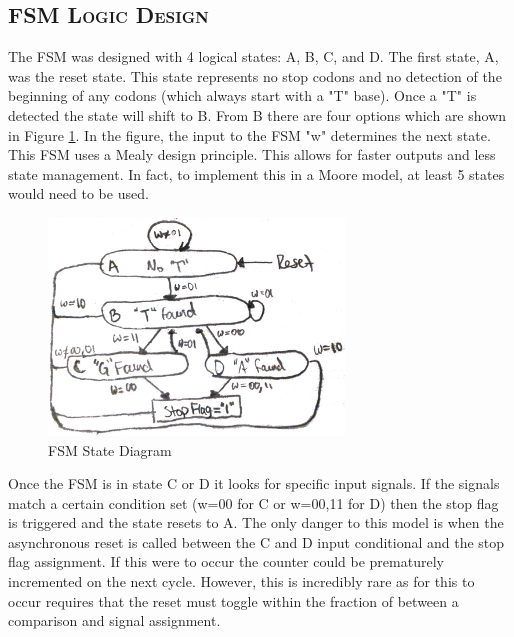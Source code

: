 \documentclass[11pt]{report}
\begin{document}
\begin{spacing}{1.5}
\subsection{\scshape FSM Logic Design}
\label{sub:design_counter}

The FSM was designed with 4 logical states: A, B, C, and D.  The first state, A, was the reset state.  This state represents no stop codons and no detection of the beginning of any codons (which always start with a "T" base).  Once a "T" is detected the state will shift to B.  From B there are four options which are shown in Figure \ref{fig:diag_fsm}.  In the figure, the input to the FSM "w" determines the next state.  This FSM uses a Mealy design principle.  This allows for faster outputs and less state management.  In fact, to implement this in a Moore model, at least 5 states would need to be used.

\vspace{15px}
\begin{figure}[H]
    \centering
    \includegraphics[width=0.7\textwidth,keepaspectratio]{fsm.png}
    \caption{FSM State Diagram}
    \label{fig:diag_fsm}
\end{figure}

Once the FSM is in state C or D it looks for specific input signals.  If the signals match a certain condition set (w=00 for C or w=00,11 for D) then the stop flag is triggered and the state resets to A.  The only danger to this model is when the asynchronous reset is called between the C and D input conditional and the stop flag assignment.  If this were to occur the counter could be prematurely incremented on the next cycle.  However, this is incredibly rare as for this to occur requires that the reset must toggle within the fraction of between a comparison and signal assignment.

\clearpage


\end{spacing}
\end{document}
